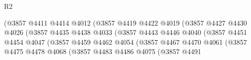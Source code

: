 \begin{lexlean}{R2}
\begin{coremodule}
                                              (@3857
                                                @4411
                                                @4414
                                                @4012
                                                (@3857
                                                  @4419
                                                  @4422
                                                  @4019
                                                  (@3857
                                                    @4427
                                                    @4430
                                                    @4026
                                                    (@3857
                                                      @4435
                                                      @4438
                                                      @4033
                                                      (@3857
                                                        @4443
                                                        @4446
                                                        @4040
                                                        (@3857
                                                          @4451
                                                          @4454
                                                          @4047
                                                          (@3857
                                                            @4459
                                                            @4462
                                                            @4054
                                                            (@3857
                                                              @4467
                                                              @4470
                                                              @4061
                                                              (@3857
                                                                @4475
                                                                @4478
                                                                @4068
                                                                (@3857
                                                                  @4483
                                                                  @4486
                                                                  @4075
                                                                  (@3857
                                                                    @4491

\end{coremodule}
\end{lexlean}

